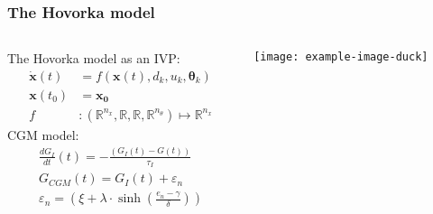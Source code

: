\documentclass[12pt,a4paper]{beamer}
\begin{document}
    \begin{frame}
    \frametitle{The Hovorka model}
    \begin{columns}

        \begin{column}{.5\textwidth}

            The Hovorka model as an IVP:
            \begin{align*}
                \boldsymbol{\dot{x}}(t) &= f(\boldsymbol{x}(t),d_k,u_k,\boldsymbol{\theta}_k)\\
                \boldsymbol{x}(t_0) &= \boldsymbol{x_0} \\
                f &: \left( \mathbb{R}^{n_x}, \mathbb{R}, \mathbb{R}, \mathbb{R}^{n_\theta} \right) \mapsto \mathbb{R}^{n_x}
            \end{align*}
            CGM model:
            \begin{align*}
                \frac{dG_I}{dt}(t) = -\frac{(G_I(t)-G(t))}{\tau_I} \\
                G_{CGM}(t) = G_I(t) + \varepsilon_n \\
                \varepsilon_n = \left( \xi +\lambda \cdot  \sinh \left(\frac{e_n - \gamma}{\delta} \right) \right)
            \end{align*}

        \end{column}

        \begin{column}{.5\textwidth}
            \texttt{[image: example-image-duck]}
        \end{column}    

        \end{columns}   
    \end{frame}
\end{document}
